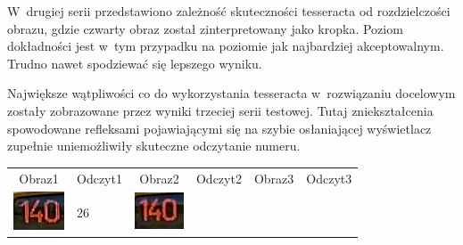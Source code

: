 W~drugiej serii przedstawiono zależność skuteczności tesseracta od 
rozdzielczości obrazu, gdzie czwarty obraz został zinterpretowany
jako kropka. Poziom dokładności jest w~tym przypadku na poziomie
jak najbardziej akceptowalnym. Trudno nawet spodziewać się lepszego
wyniku.

Największe wątpliwości
co do wykorzystania tesseracta w~rozwiązaniu docelowym zostały zobrazowane
przez wyniki trzeciej serii testowej. Tutaj zniekształcenia spowodowane
refleksami pojawiającymi się na szybie osłaniającej wyświetlacz
zupełnie uniemożliwiły skuteczne odczytanie numeru.

\begin{table}[h!]
  \centering
  \begin{tabular}{c l c l c l}
    Obraz1 & Odczyt1 & Obraz2 & Odczyt2 & Obraz3 & Odczyt3  \\ 
    \begin{minipage}{.2\textwidth}
      \includegraphics[width=\textwidth]{img/exp_number_f01}
    \end{minipage}
    &
     26
    &
    \begin{minipage}{.2\textwidth}
      \includegraphics[width=\textwidth]{img/exp_number_f02}

\end{minipage}
\end{tabular}
\end{table}
